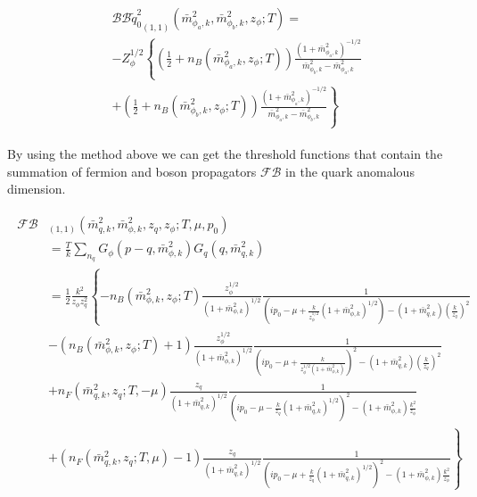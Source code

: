 \documentclass[%
reprint,
superscriptaddress,
showpacs,preprintnumbers,
 amsmath,amssymb,
 aps,
prd,
]{revtex4-1}
\begin{document}
\begin{align}
\begin{split}
&{\mathcal{BB}\tilde{q}_0^2}_{(1,1)}(\bar{m}^{2}_{\phi_a,k},\bar{m}^{2}_{\phi_b,k},z_\phi;T)=\\
&-Z_\phi^{1/2}\left\{ \left( 
\frac{1}{2}+n_B(\bar{m}^{2}_{\phi_a,k},z_\phi;T) \right)\frac{(1+\bar{m}^{2}_{\phi_a,k})^{-1/2}}{\bar{m}^{2}_{\phi_b,k}-
\bar{m}^{2}_{\phi_a,k}}\right.\\
&\left.+\left( \frac{1}{2}+n_B(\bar{m}^{2}_{\phi_b,k},z_\phi;T) \right)\frac{(1+\bar{m}^{2}_{\phi_a,k})^{-1/2}}
{\bar{m}^{2}_{\phi_a,k}-\bar{m}^{2}_{\phi_b,k}}\right\}
\end{split}
\end{align} 



By using the method above we can get the threshold functions that contain the summation of fermion and boson 
propagators $\mathcal{FB}$ in the quark anomalous dimension.
\begin{widetext}
\begin{align}
\begin{split}
\mathcal{FB}&_{(1,1)}(\bar{m}^{2}_{q,k},\bar{m}^{2}_{\phi,k},z_q,z_\phi;T,\mu,p_0)\\
&=\frac{T}{k}\sum_{n_q}G_\phi(p-q,\bar{m}^{2}_{\phi,k})G_q(q,\bar{m}^{2}_{q,k})\\
&=\frac{1}{2}\frac{k^2}{z_\phi z^{2}_{q}} \left\{ -n_B(\bar{m}^{2}_{\phi,k},z_\phi;T)
\frac{z^{1/2}_{\phi}}{(1+\bar{m}^{2}_{\phi,k})^{1/2}}\frac{1}{\left( ip_0-\mu+\frac{k}{z^{1/2}_{\phi}}(1+\bar{m}^{2}_{\phi,k})
^{1/2} \right)-(1+\bar{m}^{2}_{q,k})(\frac{k}{z_q})^{2}}\right. \\
&\left.-(n_B(\bar{m}^{2}_{\phi,k},z_\phi;T)+1)\frac{z^{1/2}_{\phi}}{(1+\bar{m}^{2}_{\phi,k})^{1/2}}\frac{1}{\left( ip_0-\mu+
\frac{k}{z^{1/2}_{\phi}(1+\bar{m}^{2}_{\phi,k})} \right)^2-(1+\bar{m}^{2}_{q,k})(\frac{k}{z_q})^{2}}\right. \\
&\left.+n_F(\bar{m}^{2}_{q,k},z_q;T,-\mu)\frac{z_q}{(1+\bar{m}^{2}_{q,k})^{1/2}}\frac{1}{\left( ip_0-\mu-\frac{k}{z_q}(1+
\bar{m}^{2}_{q,k})^{1/2} \right)^2-(1+\bar{m}^{2}_{\phi,k})\frac{k^2}{z_\phi}}\right. \\
&\left.+(n_F(\bar{m}^{2}_{q,k},z_q;T,\mu)-1)\frac{z_q}{(1+\bar{m}^{2}_{q,k})^{1/2}}\frac{1}{\left( ip_0-\mu+\frac{k}{z_q}
(1+\bar{m}^{2}_{q,k})^{1/2} \right)^2-(1+\bar{m}^{2}_{\phi,k})\frac{k^2}{z_\phi}}\right\}
\end{split}
\end{align} 
\end{widetext}
\end{document}
